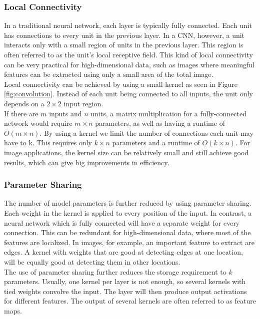 \subsubsection{Local Connectivity}
In a traditional neural network, each layer is typically fully connected. Each unit has connections to every unit in the previous layer. In a \ac{CNN}, however, a unit interacts only with a small region of units in the previous layer. This region is often referred to as the unit's local receptive field. This kind of local connectivity can be very practical for high-dimensional data, such as images where meaningful features can be extracted using only a small area of the total image. \\

Local connectivity can be achieved by using a small kernel as seen in Figure \ref{fig:convolution}. Instead of each unit being connected to all inputs, the unit only depends on a $2 \times 2$ input region. \\

If there are $m$ inputs and $n$ units, a matrix multiplication for a fully-connected network would require $m\times n$ parameters, as well as having a runtime of $O(m\times n)$. By using a kernel we limit the number of connections each unit may have to k. This requires only $k\times n$ parameters and a runtime of $O(k\times n)$. For image applications, the kernel size can be relatively small and still achieve good results, which can give big improvements in efficiency.

\subsubsection{Parameter Sharing}
The number of model parameters is further reduced by using parameter sharing. Each weight in the kernel is applied to every position of the input. In contrast, a neural network which is fully connected will have a separate weight for every connection. This can be redundant for high-dimensional data, where most of the features are localized. In images, for example, an important feature to extract are edges. A kernel with weights that are good at detecting edges at one location, will be equally good at detecting them in other locations. \\

The use of parameter sharing further reduces the storage requirement to $k$ parameters. Usually, one kernel per layer is not enough, so several kernels with tied weights convolve the input. The layer will then produce output activations for different features. The output of several kernels are  often referred to as feature maps.

